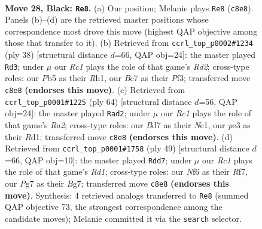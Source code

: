\documentclass[11pt]{article}
\begin{document}
\clearpage

\begin{figure}[p]\centering
\begin{subfigure}{0.46\textwidth}\centering
\resizebox{\linewidth}{!}{%
\newchessgame
\chessboard[
  setfen={2r4k/pBbb2pp/P4n2/1p3p2/1n3P2/1P2P1P1/8/RNB2RK1 b - - 5 28},
  showmover=false,
  pgfstyle=straightmove, color=movearrow, markmove={c8-e8}
]}
\caption{}
\end{subfigure}\hfill
\begin{subfigure}{0.46\textwidth}\centering
\resizebox{\linewidth}{!}{%
\newchessgame
\chessboard[
  setfen={2r1k2r/3npp1p/2b3p1/8/2B1PB2/2b2P1N/2PR1KPP/7R w k - 1 20},
  showmover=false,
  pgfstyle=straightmove, color=movearrow, markmove={d2-d3}
]}
\caption{}
\end{subfigure}
\\[4pt]
\begin{subfigure}{0.46\textwidth}\centering
\resizebox{\linewidth}{!}{%
\newchessgame
\chessboard[
  setfen={r4r2/p1k3pp/Pp2pb2/8/2P1pPP1/1P2B3/R4K1P/1bNR4 w - - 4 33},
  showmover=false,
  pgfstyle=straightmove, color=movearrow, markmove={a2-d2}
]}
\caption{}
\end{subfigure}\hfill
\begin{subfigure}{0.46\textwidth}\centering
\resizebox{\linewidth}{!}{%
\newchessgame
\chessboard[
  setfen={3r4/5rbk/3pbnpp/B3pp2/7P/3PP1P1/5PBN/1R2R1K1 b - - 1 25},
  showmover=false,
  pgfstyle=straightmove, color=movearrow, markmove={d8-d7}
]}
\caption{}
\end{subfigure}
\caption{\textbf{Move 28, Black: \texttt{Re8}.} (a) Our position; Melanie plays \texttt{Re8} (\texttt{c8e8}). Panels (b)--(d) are the retrieved master positions whose correspondence most drove this move (highest QAP objective among those that transfer to it). (b) Retrieved from \texttt{ccrl\_top\_p0002\#1234} (ply 38) [structural distance $d$=66, QAP obj=24]: the master played \texttt{Rd3}; under $\mu$ our \emph{Rc1} plays the role of that game's \emph{Rd2}; cross-type roles: our \emph{P}b5 as their \emph{R}h1, our \emph{B}c7 as their \emph{P}f3; transferred move \texttt{c8e8} \textbf{(endorses this move)}. (c) Retrieved from \texttt{ccrl\_top\_p0001\#1225} (ply 64) [structural distance $d$=56, QAP obj=24]: the master played \texttt{Rad2}; under $\mu$ our \emph{Rc1} plays the role of that game's \emph{Ra2}; cross-type roles: our \emph{B}d7 as their \emph{N}c1, our \emph{p}e3 as their \emph{R}d1; transferred move \texttt{c8e8} \textbf{(endorses this move)}. (d) Retrieved from \texttt{ccrl\_top\_p0001\#1758} (ply 49) [structural distance $d$=66, QAP obj=10]: the master played \texttt{Rdd7}; under $\mu$ our \emph{Rc1} plays the role of that game's \emph{Rd1}; cross-type roles: our \emph{N}f6 as their \emph{R}f7, our \emph{P}g7 as their \emph{B}g7; transferred move \texttt{c8e8} \textbf{(endorses this move)}. Synthesis: 4 retrieved analogs transferred to \texttt{Re8} (summed QAP objective 73, the strongest correspondence among the candidate moves); Melanie committed it via the \texttt{search} selector.}
\label{fig:thought-m55}
\end{figure}
\end{document}

